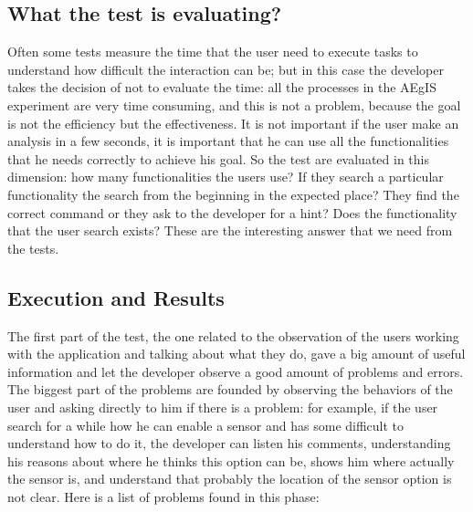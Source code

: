 \subsection{What the test is evaluating?}
Often some tests measure the time that the user need to execute tasks to understand how difficult the interaction can be; but in this case the developer takes the decision of not to evaluate the time: all the processes in the AEgIS experiment are very time consuming, and this is not a problem, because the goal is not the efficiency but the effectiveness. It is not important if the user make an analysis in a few seconds, it is important that he can use all the functionalities that he needs correctly to achieve his goal. So the test are evaluated in this dimension: how many functionalities the users use? If they search a particular functionality the search from the beginning in the expected place? They find the correct command or they ask to the developer for a hint? Does the functionality that the user search exists? These are the interesting answer that we need from the tests.  

\subsection{Execution and Results}
The first part of the test, the one related to the observation of the users working with the application and talking about what they do, gave a big amount of useful information and let the developer observe a good amount of problems and errors. 
The biggest part of the problems are founded by observing the behaviors of the user and asking directly to him if there is a problem: for example, if the user search for a while how he can enable a sensor and has some difficult to understand how to do it, the developer can listen his comments, understanding his reasons about where he thinks this option can be, shows him where actually the sensor is, and understand that probably the location of the sensor option is not clear. 
Here is a list of problems found in this phase:

